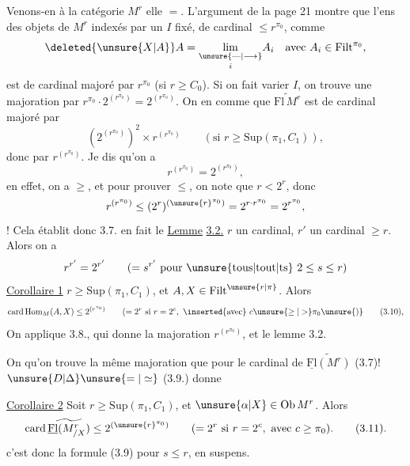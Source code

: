 Venons-en à la catégorie $M^r$ elle $=$. L'argument de la page 21 montre que l'ens des  objets de $M^r$ indexés par un $I$ fixé, de cardinal $\le r^{\pi_0}$, comme
\[
\deleted{\unsure{X|A}}A=\underset{i}{\underset{\unsure{\mathrel{\text{---}}|\longrightarrow}}{\lim}}A_i
\quad\text{avec }A_i\in\mathrm{Filt}^{\pi_0},
\]
est de cardinal majoré par $r^{\pi_0}$ (si $r\ge C_0$). Si on fait varier $I$, on trouve  une majoration par $r^{\pi_0}\cdot2^{(r^{\pi_0})}=2^{(r^{\pi_0})}$.
On en  comme  que  $\widetilde{\mathrm{Fl}\,M^r}$ est de cardinal majoré par
\[
\left(2^{(r^{\pi_0})}\right)^2\times r^{(r^{\pi_0})}\qquad(\text{si }r\ge\mathrm{Sup}(\pi_1,C_1)),
\]
donc par $r^{(r^{\pi_0})}$. Je dis qu'on a
\[
r^{(r^{\pi_0})}=2^{(r^{\pi_0})},
\]
en effet, on a $\ge$, et pour prouver $\le$, on note que $r<2^r$, donc
\[
r^{(r^{\pi_0})}\le(2^r)^{(\unsure{r}^{\pi_0})}=2^{r\cdot r^{\pi_0}}=2^{r^{\pi_0}},
\]
 ! Cela établit donc 3.7.
 en fait le
\uline{Lemme} \uline{3.2.}  $r$ un cardinal, $r'$ un cardinal $\ge r$. Alors on a
\[
r^{r'}=2^{r'}\qquad(=s^{r'}\text{ pour \unsure{tous|tout|ts} }2\le s\le r)
\]
\uline{Corollaire 1}   $r\ge\mathrm{Sup}(\pi_1,C_1)$, et $A,X\in\mathrm{Filt}^{\unsure{r|\pi}}$. Alors
\[
\mathrm{card}\,\mathrm{Hom}_M(A,X)\le2^{(r^{\pi_0})}
\qquad(=2^r\text{ si }r=2^c,\ \inserted{\text{avec}}\ c\unsure{\ge|>}\pi_0\unsure{)}
\tag*{(3.10),}
\]
On applique 3.8.,  qui donne la majoration $r^{(r^{\pi_0})}$, et le lemme 3.2.

On  qu'on trouve la même majoration que pour le cardinal de $\widetilde{\underline{\mathrm{Fl}}(M^r)}$  (3.7)! $\unsure{D|\Delta}\unsure{=|\simeq}$ (3.9.) donne

\uline{Corollaire 2} Soit $r\ge\mathrm{Sup}(\pi_1,C_1)$, et $\unsure{\alpha|X}\in\mathrm{Ob}\,M^r$. Alors
\[
\mathrm{card}\,\widetilde{\underline{\mathrm{Fl}}(M^r_{/X})}\le2^{(\unsure{r}^{\pi_0})}
\qquad(=2^r\text{ si }r=2^c,\text{ avec }c\ge\pi_0).
\tag*{(3.11).}
\]
c'est donc la formule (3.9) pour $s\le r$,  en suspens.
